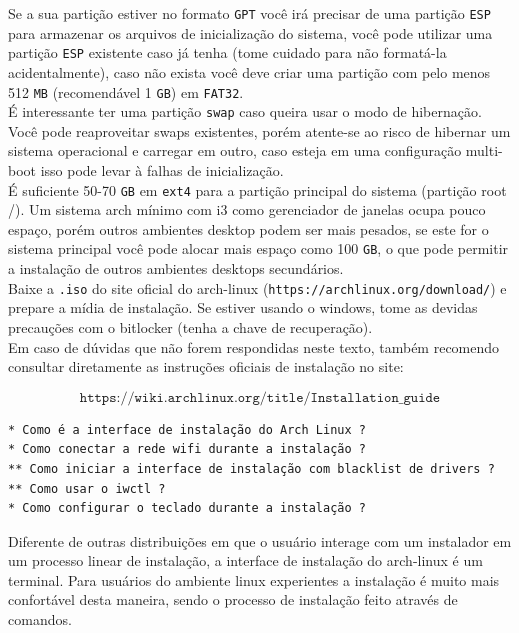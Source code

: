 \documentclass[12pt,a4paper]{article}
\begin{document}
Se a sua partição estiver no formato \texttt{GPT} você irá precisar de uma partição \texttt{ESP} para armazenar os arquivos de inicialização do sistema, você pode utilizar uma partição \texttt{ESP} existente caso já tenha (tome cuidado para não formatá-la acidentalmente), caso não exista você deve criar uma partição com pelo menos 512 \texttt{MB} (recomendável 1 \texttt{GB}) em \texttt{FAT32}.\\

É interessante ter uma partição \texttt{swap} caso queira usar o modo de hibernação. Você pode reaproveitar swaps existentes, porém atente-se ao risco de hibernar um sistema operacional e carregar em outro, caso esteja em uma configuração multi-boot isso pode levar à falhas de inicialização.\\

É suficiente 50-70 \texttt{GB} em \texttt{ext4} para a partição principal do sistema (partição root /). Um sistema arch mínimo com i3 como gerenciador de janelas ocupa pouco espaço, porém outros ambientes desktop podem ser mais pesados, se este for o sistema principal você pode alocar mais espaço como 100 \texttt{GB}, o que pode permitir a instalação de outros ambientes desktops secundários. \\

Baixe a \texttt{.iso} do site oficial do arch-linux (\texttt{https://archlinux.org/download/}) e prepare a mídia de instalação. Se estiver usando o windows, tome as devidas precauções com o bitlocker (tenha a chave de recuperação). \\

Em caso de dúvidas que não forem respondidas neste texto, também recomendo consultar diretamente as instruções oficiais de instalação no site:

$$ \texttt{https://wiki.archlinux.org/title/Installation\_guide} $$

\begin{lstlisting}
* Como é a interface de instalação do Arch Linux ?
* Como conectar a rede wifi durante a instalação ?
** Como iniciar a interface de instalação com blacklist de drivers ?
** Como usar o iwctl ?
* Como configurar o teclado durante a instalação ?
\end{lstlisting}

\vspace{\baselineskip}

Diferente de outras distribuições em que o usuário interage com um instalador em um processo linear de instalação, a interface de instalação do arch-linux é um terminal. Para usuários do ambiente linux experientes a instalação é muito mais confortável desta maneira, sendo o processo de instalação feito através de comandos. \\ 
\end{document}

